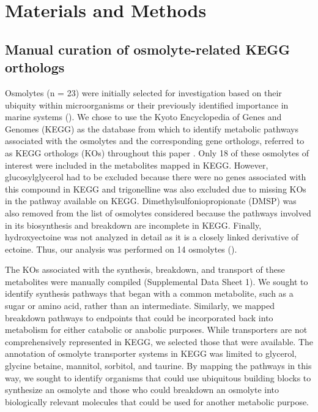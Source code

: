 \documentclass[utf8]{frontiersSCNS} %
\begin{document}
\section{Materials and Methods}

\subsection{Manual curation of osmolyte-related KEGG orthologs}

Osmolytes (n = 23) were initially selected for investigation based on their ubiquity within microorganisms or their previously identified importance in marine systems (). We chose to use the Kyoto Encyclopedia of Genes and Genomes (KEGG) as the database from which to identify metabolic pathways associated with the osmolytes and the corresponding gene orthologs, referred to as KEGG orthologs (KOs) throughout this paper \citep{Kanehisa2000,Kanehisa2012}. Only 18 of these osmolytes of interest were included in the metabolites mapped in KEGG. However, glucosylglycerol had to be excluded because there were no genes associated with this compound in KEGG and trigonelline was also excluded due to missing KOs in the pathway available on KEGG. Dimethylsulfoniopropionate (DMSP) was also removed from the list of osmolytes considered because the pathways involved in its biosynthesis and breakdown are incomplete in KEGG. Finally, hydroxyectoine was not analyzed in detail as it is a closely linked derivative of ectoine. Thus, our analysis was performed on 14 osmolytes ().

The KOs associated with the synthesis, breakdown, and transport of these metabolites were manually compiled (Supplemental Data Sheet 1). We sought to identify synthesis pathways that began with a common metabolite, such as a sugar or amino acid, rather than an intermediate. Similarly, we mapped breakdown pathways to endpoints that could be incorporated back into metabolism for either catabolic or anabolic purposes. While transporters are not comprehensively represented in KEGG, we selected those that were available. The annotation of osmolyte transporter systems in KEGG was limited to glycerol, glycine betaine, mannitol, sorbitol, and taurine. By mapping the pathways in this way, we sought to identify organisms that could use ubiquitous building blocks to synthesize an osmolyte and those who could breakdown an osmolyte into biologically relevant molecules that could be used for another metabolic purpose.
\end{document}
